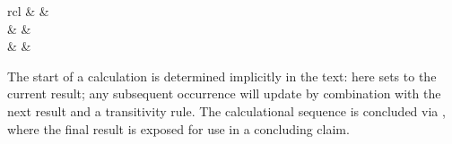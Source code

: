 \begin{isabellebody}
\begin{isamarkuptext}
  \begin{matharray}{rcl}
    \hyperlink{command.also}{\mbox{}} & \equiv & \hyperlink{command.note}{\mbox{}}~ \\
    \hyperlink{command.also}{\mbox{}} & \equiv & \hyperlink{command.note}{\mbox{}}~ \\[0.5ex]
    \hyperlink{command.finally}{\mbox{}} & \equiv & \hyperlink{command.also}{\mbox{}}~\hyperlink{command.from}{\mbox{}}~ \\
  \end{matharray}

  \noindent The start of a calculation is determined implicitly in the
  text: here \hyperlink{command.also}{\mbox{}} sets \hyperlink{fact.calculation}{\mbox{}} to the current
  result; any subsequent occurrence will update \hyperlink{fact.calculation}{\mbox{}} by
  combination with the next result and a transitivity rule.  The
  calculational sequence is concluded via \hyperlink{command.finally}{\mbox{}}, where
  the final result is exposed for use in a concluding claim.


\end{isamarkuptext}
\end{isabellebody}
